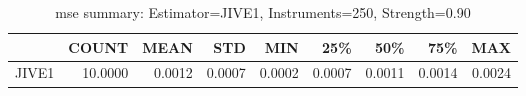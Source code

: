 \begin{table}[ht]
\centering
\caption{mse summary: Estimator=JIVE1, Instruments=250, Strength=0.90}
\begin{tabular}{lrrrrrrrr}
\toprule
 & COUNT & MEAN & STD & MIN & 25\% & 50\% & 75\% & MAX \\
\midrule
JIVE1 & 10.0000 & 0.0012 & 0.0007 & 0.0002 & 0.0007 & 0.0011 & 0.0014 & 0.0024 \\
\bottomrule
\end{tabular}
\end{table}
